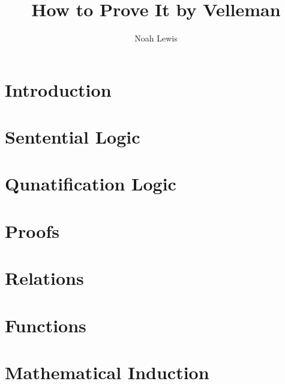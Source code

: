\documentclass[10pt]{article}  %
\title{How to Prove It by Velleman}
\author{Noah Lewis}
\begin{document}
\maketitle

\tableofcontents

\section{Introduction}

\section{Sentential Logic}

\section{Qunatification Logic}

\section{Proofs}

\section{Relations}

\section{Functions}

\section{Mathematical Induction}

\end{document}
